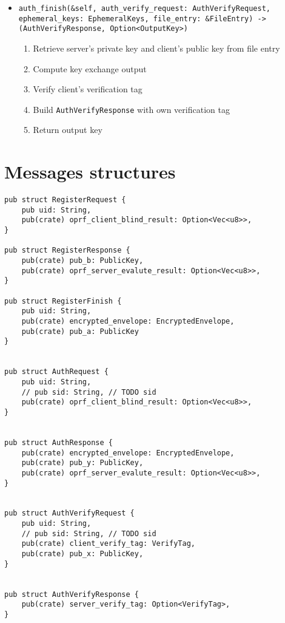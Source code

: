 \documentclass[../report.tex]{subfiles}
\begin{document}
\begin{itemize}
 \item \verb|auth_finish(&self, auth_verify_request: AuthVerifyRequest, ephemeral_keys: EphemeralKeys, file_entry: &FileEntry) -> (AuthVerifyResponse, Option<OutputKey>)|
  \begin{enumerate}
    \item Retrieve server's private key and client's public key from file entry
    \item Compute key exchange output
    \item Verify client's verification tag
    \item Build \verb|AuthVerifyResponse| with own verification tag
    \item Return output key
  \end{enumerate}
  
\end{itemize}


\section{Messages structures}


\begin{verbatim}
pub struct RegisterRequest {
    pub uid: String,
    pub(crate) oprf_client_blind_result: Option<Vec<u8>>,
}

pub struct RegisterResponse {
    pub(crate) pub_b: PublicKey,
    pub(crate) oprf_server_evalute_result: Option<Vec<u8>>,
}

pub struct RegisterFinish {
    pub uid: String,
    pub(crate) encrypted_envelope: EncryptedEnvelope,
    pub(crate) pub_a: PublicKey
}


pub struct AuthRequest {
    pub uid: String,
    // pub sid: String, // TODO sid
    pub(crate) oprf_client_blind_result: Option<Vec<u8>>,
}


pub struct AuthResponse {
    pub(crate) encrypted_envelope: EncryptedEnvelope,
    pub(crate) pub_y: PublicKey,
    pub(crate) oprf_server_evalute_result: Option<Vec<u8>>,
}


pub struct AuthVerifyRequest {
    pub uid: String,
    // pub sid: String, // TODO sid
    pub(crate) client_verify_tag: VerifyTag,
    pub(crate) pub_x: PublicKey,
}


pub struct AuthVerifyResponse {
    pub(crate) server_verify_tag: Option<VerifyTag>,
}
\end{verbatim}
\end{document}
